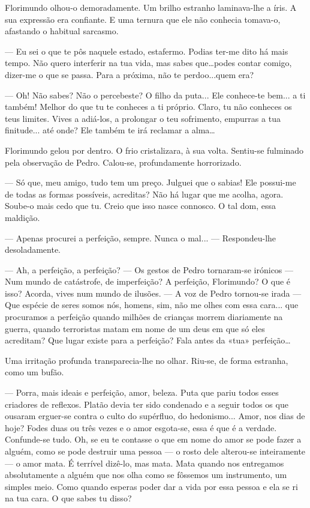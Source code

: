 Florimundo olhou-o demoradamente. Um brilho estranho laminava-lhe a
íris. A sua expressão era confiante. E uma ternura que ele não conhecia
tomava-o, afastando o habitual sarcasmo.

--- Eu sei o que te pôs naquele estado, estafermo. Podias ter-me dito há
mais tempo. Não quero interferir na tua vida, mas sabes que\ldots{}podes
contar comigo, dizer-me o que se passa. Para a próxima, não te
perdoo...quem era?

--- Oh! Não sabes? Não o percebeste? O filho da puta... Ele conhece-te
bem... a ti também! Melhor do que tu te conheces a ti próprio. Claro, tu
não conheces os teus limites. Vives a adiá-los, a prolongar o teu
sofrimento, empurras a tua finitude... até onde? Ele também te irá
reclamar a alma\ldots{}

Florimundo gelou por dentro. O frio cristalizara, à sua volta. Sentiu-se
fulminado pela observação de Pedro. Calou-se, profundamente horrorizado.

--- Só que, meu amigo, tudo tem um preço. Julguei que o sabias! Ele
possui-me de todas as formas possíveis, acreditas? Não há lugar que me
acolha, agora. Soube-o mais cedo que tu. Creio que isso nasce connosco.
O tal dom, essa maldição.

--- Apenas procurei a perfeição, sempre. Nunca o mal... --- Respondeu-lhe
desoladamente.

--- Ah, a perfeição, a perfeição? --- Os gestos de Pedro tornaram-se
irónicos --- Num mundo de catástrofe, de imperfeição? A perfeição,
Florimundo? O que é isso? Acorda, vives num mundo de ilusões. --- A voz de
Pedro tornou-se irada --- Que espécie de seres somos nós, homens, sim, não
me olhes com essa cara... que procuramos a perfeição quando milhões de
crianças morrem diariamente na guerra, quando terroristas matam em nome
de um deus em que só eles acreditam? Que lugar existe para a perfeição?
Fala antes da «tua» perfeição\ldots{}

Uma irritação profunda transparecia-lhe no olhar. Riu-se, de forma
estranha, como um bufão.

--- Porra, mais ideais e perfeição, amor, beleza. Puta que pariu todos
esses criadores de reflexos. Platão devia ter sido condenado e a seguir
todos os que ousaram erguer-se contra o culto do supérfluo, do
hedonismo... Amor, nos dias de hoje? Fodes duas ou três vezes e o amor
esgota-se, essa é que é a verdade. Confunde-se tudo. Oh, se eu te
contasse o que em nome do amor se pode fazer a alguém, como se pode
destruir uma pessoa --- o rosto dele alterou-se inteiramente --- o amor
mata. É terrível dizê-lo, mas mata. Mata quando nos entregamos
absolutamente a alguém que nos olha como se fôssemos um instrumento, um
simples meio. Como quando esperas poder dar a vida por essa pessoa e ela
se ri na tua cara. O que sabes tu disso?

